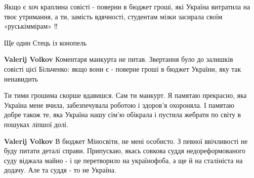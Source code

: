 \begin{itemize}
Якщо є хоч краплина совісті - поверни в бюджет гроші, які Україна витратила на
твоє утримання, а ти, замість вдячності, студентам мізки засирала своїм
«руськіммірам» ‼️

\begin{itemize}
 
Ще один Стець із конопель

 
\textbf{Valerij Volkov} Коментаря манкурта не питав. Звертання було до залишків
совісті цієї Більченко: якщо вони є - поверне гроші в бюджет України, яку так
ненавидить

 
Ти тими грошима скорше вдавишся.
Сам ти манкурт.
Я памятаю прекрасно, яка Україна мене вчила, забезпечувала роботою і здоров'я охороняла.
І памятаю добре також те, яка Україна нашу сім'ю обікрала і пустила жебрати по світу в пошуках ліпшої долі.

 
\textbf{Valerij Volkov} В бюджет Міносвіти, не мені особисто.
З певної ввічливості не буду питати деталі справи. Припускаю, якась совкова суддя недореформованого суду віджала майно - і це перетворило на українофоба, а ще й на сталініста на додачу.
Але та суддя - то не Україна.

 

\end{itemize}
\end{itemize}
